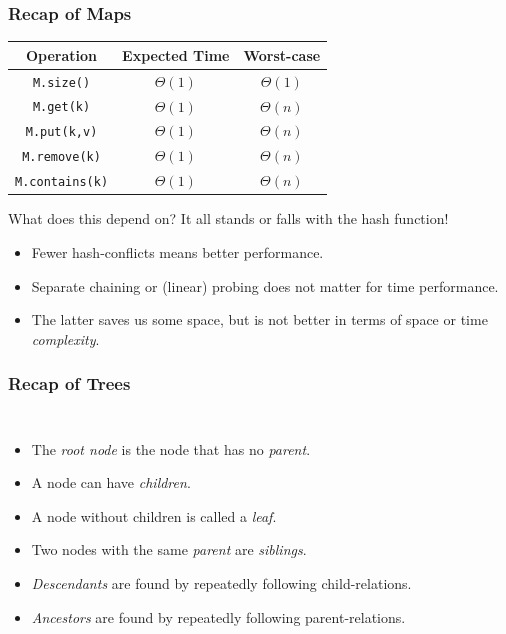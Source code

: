 \begin{frame}
	\frametitle{Recap of Maps}
	
	\begin{center}
		\begin{tabular}{c | c | c}
			Operation & Expected Time & Worst-case \\
			\midrule
			\texttt{M.size()} & $\Theta(1)$& $\Theta(1)$\\
			\texttt{M.get(k)}  & $\Theta(1)$& $\Theta(n)$\\
			\texttt{M.put(k,v)} & $\Theta(1)$& $\Theta(n)$\\
			\texttt{M.remove(k)} & $\Theta(1)$& $\Theta(n)$\\
			\texttt{M.contains(k)} & $\Theta(1)$& $\Theta(n)$\\
		\end{tabular}
	\end{center}
		\begin{block}{What does this depend on?}
			It all stands or falls with the hash function!
			\begin{itemize}
				\item Fewer hash-conflicts means better performance.
				\item Separate chaining or (linear) probing does not matter for time performance.
				\item The latter saves us some space, but is not better in terms of space or time \textit{complexity}.
			\end{itemize}
		\end{block}	
\end{frame}

\begin{frame}
	\frametitle{Recap of Trees}
	\begin{columns}
		\begin{itemize}
			\item The \textit{root node} is the node that has no \textit{parent}.
			\item A node can have \textit{children}.
			\item A node without children is called a \textit{leaf}.
			\item Two nodes with the same \textit{parent} are \textit{siblings}.
			\item \textit{Descendants} are found by repeatedly following child-relations.
			\item \textit{Ancestors} are found by repeatedly following parent-relations.
		\end{itemize}
	\end{columns}
\end{frame}

